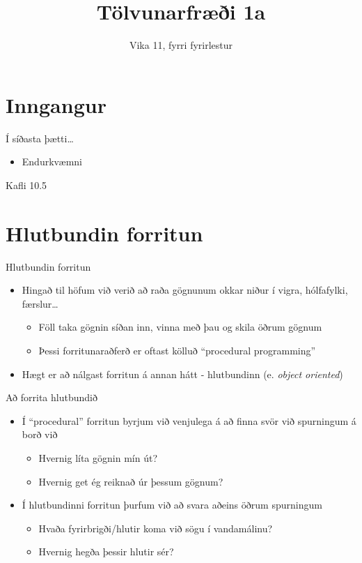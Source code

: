 \documentclass[handout]{beamer}
\title{Tölvunarfræði 1a}
\subtitle{Vika 11, fyrri fyrirlestur}
\begin{document}
\begin{frame}
\titlepage
\end{frame}

\section{Inngangur}

\begin{frame}{Í síðasta þætti\ldots}
\begin{itemize}
 \item Endurkvæmni
\end{itemize}
Kafli 10.5
\end{frame}

\section{Hlutbundin forritun}

\begin{frame}{Hlutbundin forritun}
\begin{itemize}
 \item Hingað til höfum við verið að raða gögnunum okkar niður í vigra, hólfafylki, færslur\ldots
 \begin{itemize}
  \item Föll taka gögnin síðan inn, vinna með þau og skila öðrum gögnum
  \item Þessi forritunaraðferð er oftast kölluð ``procedural programming''
 \end{itemize}
 \item Hægt er að nálgast forritun á annan hátt - hlutbundinn (e. \emph{object oriented})
\end{itemize}
\end{frame}

\begin{frame}{Að forrita hlutbundið}
 \begin{itemize}
  \item Í ``procedural'' forritun byrjum við venjulega á að finna svör við spurningum á borð við
  \begin{itemize}
   \item Hvernig líta gögnin mín út?
   \item Hvernig get ég reiknað úr þessum gögnum?
  \end{itemize}
  \item Í hlutbundinni forritun þurfum við að svara aðeins öðrum spurningum
  \begin{itemize}
   \item Hvaða fyrirbrigði/hlutir koma við sögu í vandamálinu?
   \item Hvernig hegða þessir hlutir sér?
  \end{itemize}
 \end{itemize}
\end{frame}
\end{document}
